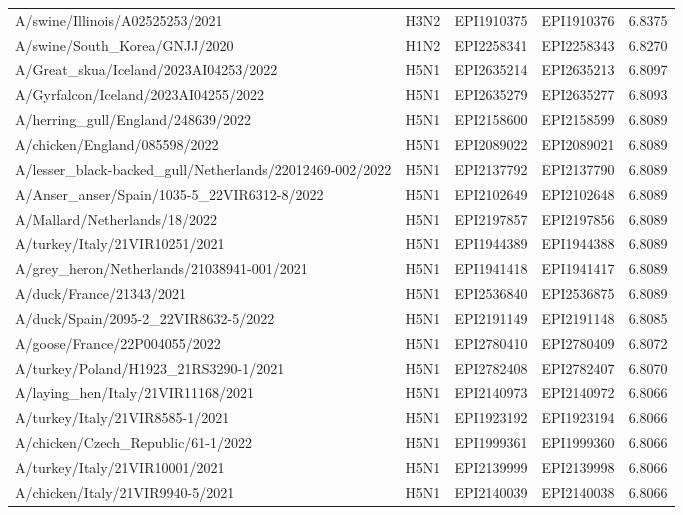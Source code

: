 \begin{tabular}{L{1.95in}|L{.25in}|L{.60in}|L{.6in}|C{1in}}
A/swine/Illinois/A02525253/2021&H3N2&EPI1910375&EPI1910376&6.8375\\
A/swine/South\_Korea/GNJJ/2020&H1N2&EPI2258341&EPI2258343&6.8270\\
A/Great\_skua/Iceland/2023AI04253/2022&H5N1&EPI2635214&EPI2635213&6.8097\\
A/Gyrfalcon/Iceland/2023AI04255/2022&H5N1&EPI2635279&EPI2635277&6.8093\\
A/herring\_gull/England/248639/2022&H5N1&EPI2158600&EPI2158599&6.8089\\
A/chicken/England/085598/2022&H5N1&EPI2089022&EPI2089021&6.8089\\
A/lesser\_black-backed\_gull/Netherlands/22012469-002/2022&H5N1&EPI2137792&EPI2137790&6.8089\\
A/Anser\_anser/Spain/1035-5\_22VIR6312-8/2022&H5N1&EPI2102649&EPI2102648&6.8089\\
A/Mallard/Netherlands/18/2022&H5N1&EPI2197857&EPI2197856&6.8089\\
A/turkey/Italy/21VIR10251/2021&H5N1&EPI1944389&EPI1944388&6.8089\\
A/grey\_heron/Netherlands/21038941-001/2021&H5N1&EPI1941418&EPI1941417&6.8089\\
A/duck/France/21343/2021&H5N1&EPI2536840&EPI2536875&6.8089\\
A/duck/Spain/2095-2\_22VIR8632-5/2022&H5N1&EPI2191149&EPI2191148&6.8085\\
A/goose/France/22P004055/2022&H5N1&EPI2780410&EPI2780409&6.8072\\
A/turkey/Poland/H1923\_21RS3290-1/2021&H5N1&EPI2782408&EPI2782407&6.8070\\
A/laying\_hen/Italy/21VIR11168/2021&H5N1&EPI2140973&EPI2140972&6.8066\\
A/turkey/Italy/21VIR8585-1/2021&H5N1&EPI1923192&EPI1923194&6.8066\\
A/chicken/Czech\_Republic/61-1/2022&H5N1&EPI1999361&EPI1999360&6.8066\\
A/turkey/Italy/21VIR10001/2021&H5N1&EPI2139999&EPI2139998&6.8066\\
A/chicken/Italy/21VIR9940-5/2021&H5N1&EPI2140039&EPI2140038&6.8066\\

\end{tabular}

